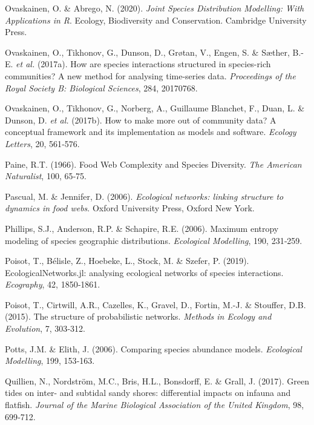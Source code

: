 \documentclass[12pt,]{article}
\newlength{\cslhangindent}
\newenvironment{cslreferences}%
  {\setlength{\parindent}{0pt}%
  \everypar{\setlength{\hangindent}{\cslhangindent}}\ignorespaces}%
  {\par}
\begin{document}
\begin{cslreferences}
\leavevmode\hypertarget{ref-Ovaskainen_2020}{}%
Ovaskainen, O. \& Abrego, N. (2020). \emph{Joint Species Distribution
Modelling: With Applications in R}. Ecology, Biodiversity and
Conservation. Cambridge University Press.

\leavevmode\hypertarget{ref-Ovaskainen_2017b}{}%
Ovaskainen, O., Tikhonov, G., Dunson, D., Grøtan, V., Engen, S. \&
Sæther, B.-E. \emph{et al.} (2017a). How are species interactions
structured in species-rich communities? A new method for analysing
time-series data. \emph{Proceedings of the Royal Society B: Biological
Sciences}, 284, 20170768.

\leavevmode\hypertarget{ref-Ovaskainen_2017a}{}%
Ovaskainen, O., Tikhonov, G., Norberg, A., Guillaume Blanchet, F., Duan,
L. \& Dunson, D. \emph{et al.} (2017b). How to make more out of
community data? A conceptual framework and its implementation as models
and software. \emph{Ecology Letters}, 20, 561‑576.

\leavevmode\hypertarget{ref-Paine_1966}{}%
Paine, R.T. (1966). Food Web Complexity and Species Diversity. \emph{The
American Naturalist}, 100, 65‑75.

\leavevmode\hypertarget{ref-Pascual_2006}{}%
Pascual, M. \& Jennifer, D. (2006). \emph{Ecological networks: linking
structure to dynamics in food webs}. Oxford University Press, Oxford New
York.

\leavevmode\hypertarget{ref-Phillips_2006}{}%
Phillips, S.J., Anderson, R.P. \& Schapire, R.E. (2006). Maximum entropy
modeling of species geographic distributions. \emph{Ecological
Modelling}, 190, 231‑259.

\leavevmode\hypertarget{ref-Poisot_2019}{}%
Poisot, T., Bélisle, Z., Hoebeke, L., Stock, M. \& Szefer, P. (2019).
EcologicalNetworks.jl: analysing ecological networks of species
interactions. \emph{Ecography}, 42, 1850‑1861.

\leavevmode\hypertarget{ref-Poisot_2015}{}%
Poisot, T., Cirtwill, A.R., Cazelles, K., Gravel, D., Fortin, M.-J. \&
Stouffer, D.B. (2015). The structure of probabilistic networks.
\emph{Methods in Ecology and Evolution}, 7, 303‑312.

\leavevmode\hypertarget{ref-Potts_2006}{}%
Potts, J.M. \& Elith, J. (2006). Comparing species abundance models.
\emph{Ecological Modelling}, 199, 153‑163.

\leavevmode\hypertarget{ref-Quillien_2017}{}%
Quillien, N., Nordström, M.C., Bris, H.L., Bonsdorff, E. \& Grall, J.
(2017). Green tides on inter- and subtidal sandy shores: differential
impacts on infauna and flatfish. \emph{Journal of the Marine Biological
Association of the United Kingdom}, 98, 699‑712.


\end{cslreferences}
\end{document}
